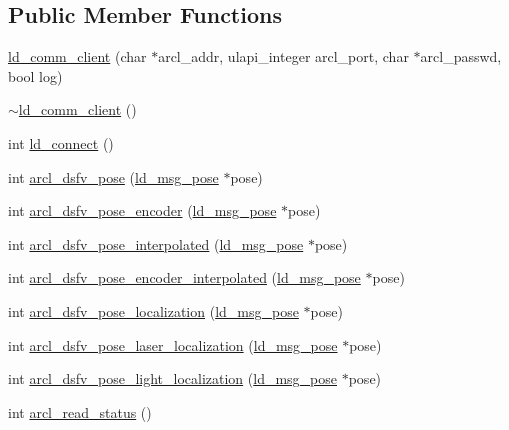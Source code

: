 \subsection*{Public Member Functions}
\begin{DoxyCompactItemize}
\item 
\mbox{\hyperlink{classld__comm__client_abc88de149791710a26470a290de031ef}{ld\+\_\+comm\+\_\+client}} (char $\ast$arcl\+\_\+addr, ulapi\+\_\+integer arcl\+\_\+port, char $\ast$arcl\+\_\+passwd, bool log)
\item 
\mbox{\hyperlink{classld__comm__client_a08a4beffb5099ba02edd0acbbcf16187}{$\sim$ld\+\_\+comm\+\_\+client}} ()
\item 
int \mbox{\hyperlink{classld__comm__client_a254638599da673cf2f376166a8f9b984}{ld\+\_\+connect}} ()
\item 
int \mbox{\hyperlink{classld__comm__client_a9dfef26a96307abc124c780148b2fdd1}{arcl\+\_\+dsfv\+\_\+pose}} (\mbox{\hyperlink{structld__msg__pose}{ld\+\_\+msg\+\_\+pose}} $\ast$pose)
\item 
int \mbox{\hyperlink{classld__comm__client_a8fe145161e824738ccd351c5533b9d1e}{arcl\+\_\+dsfv\+\_\+pose\+\_\+encoder}} (\mbox{\hyperlink{structld__msg__pose}{ld\+\_\+msg\+\_\+pose}} $\ast$pose)
\item 
int \mbox{\hyperlink{classld__comm__client_a1cbdd2fcd2ea8d7d4072c3953ce5f11d}{arcl\+\_\+dsfv\+\_\+pose\+\_\+interpolated}} (\mbox{\hyperlink{structld__msg__pose}{ld\+\_\+msg\+\_\+pose}} $\ast$pose)
\item 
int \mbox{\hyperlink{classld__comm__client_a0b983bc131cfc619e8ab8785daef32e8}{arcl\+\_\+dsfv\+\_\+pose\+\_\+encoder\+\_\+interpolated}} (\mbox{\hyperlink{structld__msg__pose}{ld\+\_\+msg\+\_\+pose}} $\ast$pose)
\item 
int \mbox{\hyperlink{classld__comm__client_a9c0159e1ab1f6112e4ee9e14e2ae4975}{arcl\+\_\+dsfv\+\_\+pose\+\_\+localization}} (\mbox{\hyperlink{structld__msg__pose}{ld\+\_\+msg\+\_\+pose}} $\ast$pose)
\item 
int \mbox{\hyperlink{classld__comm__client_ac1520245a4281887fc5442933d519bf9}{arcl\+\_\+dsfv\+\_\+pose\+\_\+laser\+\_\+localization}} (\mbox{\hyperlink{structld__msg__pose}{ld\+\_\+msg\+\_\+pose}} $\ast$pose)
\item 
int \mbox{\hyperlink{classld__comm__client_a513a0bddf7967271eb3ba45d50f47fe6}{arcl\+\_\+dsfv\+\_\+pose\+\_\+light\+\_\+localization}} (\mbox{\hyperlink{structld__msg__pose}{ld\+\_\+msg\+\_\+pose}} $\ast$pose)
\item 
int \mbox{\hyperlink{classld__comm__client_aa6ff20939ad36ccbe390d1c3d9b1b242}{arcl\+\_\+read\+\_\+status}} ()

\end{DoxyCompactItemize}
